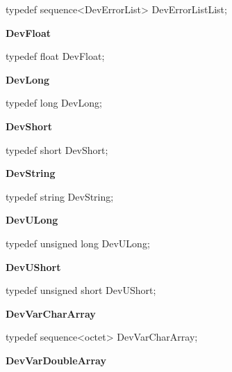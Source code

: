 typedef sequence<DevErrorList> DevErrorListList;\\


\begin{flushleft}
\textbf{DevFloat}
\par\end{flushleft}

typedef float DevFloat;\\


\begin{flushleft}
\textbf{DevLong}
\par\end{flushleft}

typedef long DevLong;\\


\begin{flushleft}
\textbf{DevShort}
\par\end{flushleft}

typedef short DevShort;\\


\begin{flushleft}
\textbf{DevString}
\par\end{flushleft}

typedef string DevString;\\


\begin{flushleft}
\textbf{DevULong}
\par\end{flushleft}

typedef unsigned long DevULong;\\


\begin{flushleft}
\textbf{DevUShort}
\par\end{flushleft}

typedef unsigned short DevUShort;\\


\begin{flushleft}
\textbf{DevVarCharArray}
\par\end{flushleft}

typedef sequence<octet> DevVarCharArray;\\


\begin{flushleft}
\textbf{DevVarDoubleArray}
\par\end{flushleft}

